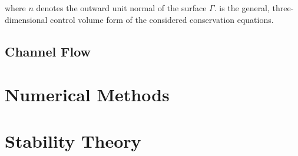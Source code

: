 \documentclass[Prelim,12pt]{WisconsinThesis}
\renewcommand{\S}   {\ensuremath{\Gamma}}
\begin{document}
where $n$ denotes the outward unit normal of the surface \S{}.
 is the general, three-dimensional control volume form of the considered conservation equations.

\subsection{Channel Flow}

\section{Numerical Methods}
\section{Stability Theory}
\end{document}
